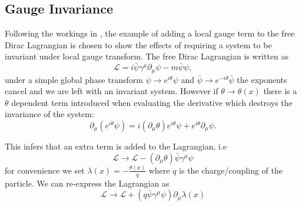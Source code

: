 \subsection{Gauge Invariance} %
\label{sub:gauge_invariance}
Following the workings in , the example of adding a local gauge 
term to the free Dirac Lagrangian is chosen to show the effects of requiring a 
system to be invariant under local gauge transform. The free Dirac Lagrangian 
is written as
\begin{equation}
  \mathcal{L} = i\bar{\psi}\gamma^{\mu}\partial_{\mu}\psi - m\bar{\psi}\psi,
  \label{eq:freeDiracL}
\end{equation}
under a simple global phase transform $\psi\rightarrow e^{i\theta}\psi$ and 
$\bar{\psi}\rightarrow e^{-i\theta}\bar{\psi}$ the exponents cancel and we are 
left with an invariant system. However if $\theta\rightarrow\theta (x)$ there 
is a $\theta$ dependent  term introduced when evaluating the derivative which 
destroys the invariance of the system:
\begin{equation}
  \partial_{\mu}\left(e^{i\theta}\psi\right) = i\left(\partial_{\mu}\theta\right)e^{i\theta}\psi + e^{i\theta}\partial_{\mu}\psi.
\end{equation} 

This infers that an extra term is added to the Lagrangian, i.e
\begin{equation}
  \mathcal{L}\rightarrow\mathcal{L}-\left(\partial_{\mu}\theta\right)\bar{\psi}\gamma^{\mu}\psi
\end{equation}
for convenience we set $\lambda(x) = -\frac{\theta(x)}{q}$ where $q$ is the 
charge/coupling of the particle. We can re-express the Lagrangian as
\begin{equation}  \mathcal{L} \rightarrow \mathcal{L} + \left( q\bar{\psi}\gamma^{\mu} \psi \right) \partial_{\mu} \lambda(x)
  \label{eq:diracLplusLambda}
\end{equation}

